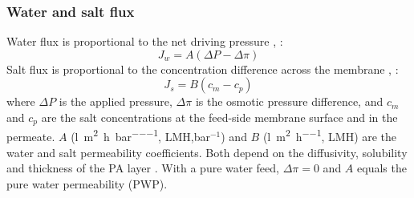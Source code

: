 \subsubsection{Water and salt flux}
Water flux is proportional to the net driving pressure \citep[Eq.~12]{Lonsdale1965}, \citep[Eq.~37]{Wijmans1995}:
\begin{equation}
  J_w = A(\Delta P - \Delta\pi)
  \label{eq:water-flux}
\end{equation}
Salt flux is proportional to the concentration difference across the membrane \citep[Eq.~14]{Lonsdale1965}, \citep[Eqs.~40--41]{Wijmans1995}:
\begin{equation}
  J_s = B(c_m - c_p)
  \label{eq:salt-flux}
\end{equation}
where $\Delta P$ is the applied pressure, $\Delta\pi$ is the osmotic pressure difference, and $c_m$ and $c_p$ are the salt concentrations at the feed-side membrane surface and in the permeate. $A$ (\unit{\litre\per\square\metre\per\hour\per\bar}, LMH,bar$^{-1}$) and $B$ (\unit{\litre\per\square\metre\per\hour}, LMH) are the water and salt permeability coefficients. Both depend on the diffusivity, solubility and thickness of the PA layer \citep[Eqs.~37, 41]{Wijmans1995}. With a pure water feed, $\Delta\pi = 0$ and $A$ equals the pure water permeability (PWP).


